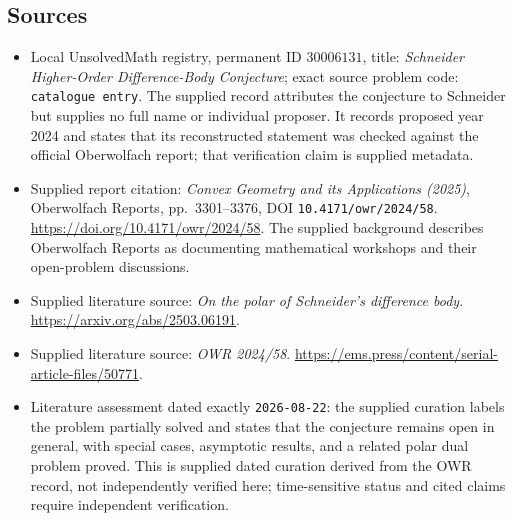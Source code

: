 \documentclass[11pt]{article}
\begin{document}
\subsection{Sources}
\begin{itemize}
\item Local UnsolvedMath registry, permanent ID \(30006131\), title: \emph{Schneider Higher-Order Difference-Body Conjecture}; exact source problem code: \texttt{catalogue entry}. The supplied record attributes the conjecture to Schneider but supplies no full name or individual proposer. It records proposed year 2024 and states that its reconstructed statement was checked against the official Oberwolfach report; that verification claim is supplied metadata.
\item Supplied report citation: \emph{Convex Geometry and its Applications (2025)}, Oberwolfach Reports, pp.\ 3301--3376, DOI \texttt{10.4171/owr/2024/58}. \url{https://doi.org/10.4171/owr/2024/58}. The supplied background describes Oberwolfach Reports as documenting mathematical workshops and their open-problem discussions.
\item Supplied literature source: \emph{On the polar of Schneider's difference body}. \url{https://arxiv.org/abs/2503.06191}.
\item Supplied literature source: \emph{OWR 2024/58}. \url{https://ems.press/content/serial-article-files/50771}.
\item Literature assessment dated exactly \texttt{2026-08-22}: the supplied curation labels the problem partially solved and states that the conjecture remains open in general, with special cases, asymptotic results, and a related polar dual problem proved. This is supplied dated curation derived from the OWR record, not independently verified here; time-sensitive status and cited claims require independent verification.
\end{itemize}
\end{document}
